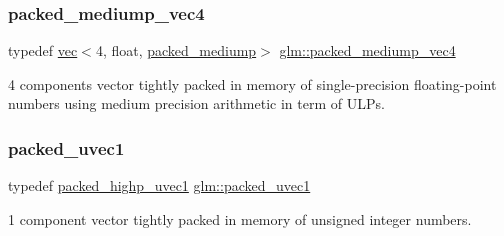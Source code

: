 \mbox{\label{group__gtc__type__aligned_ga18f1166b7888d6e0d7d659f5a022e6ea}} 
\subsubsection{\texorpdfstring{packed\+\_\+mediump\+\_\+vec4}{packed\_mediump\_vec4}}
{\footnotesize\ttfamily typedef \hyperlink{structglm_1_1vec}{vec}$<$4, float, \hyperlink{namespaceglm_a36ed105b07c7746804d7fdc7cc90ff25a9604654c3b137cd7898689fd34b25bc0}{packed\+\_\+mediump}$>$ \hyperlink{group__gtc__type__aligned_ga18f1166b7888d6e0d7d659f5a022e6ea}{glm\+::packed\+\_\+mediump\+\_\+vec4}}



4 components vector tightly packed in memory of single-\/precision floating-\/point numbers using medium precision arithmetic in term of U\+L\+Ps. 

\mbox{\label{group__gtc__type__aligned_gab4eb372e84e817a0d29128128394df01}} 
\subsubsection{\texorpdfstring{packed\+\_\+uvec1}{packed\_uvec1}}
{\footnotesize\ttfamily typedef \hyperlink{group__gtc__type__aligned_ga160352f526bef94d143ccb525095936e}{packed\+\_\+highp\+\_\+uvec1} \hyperlink{group__gtc__type__aligned_gab4eb372e84e817a0d29128128394df01}{glm\+::packed\+\_\+uvec1}}



1 component vector tightly packed in memory of unsigned integer numbers. 

\mbox{\label{group__gtc__type__aligned_gac05992fb0ced52150634ce1d8f95a8ad}} 
